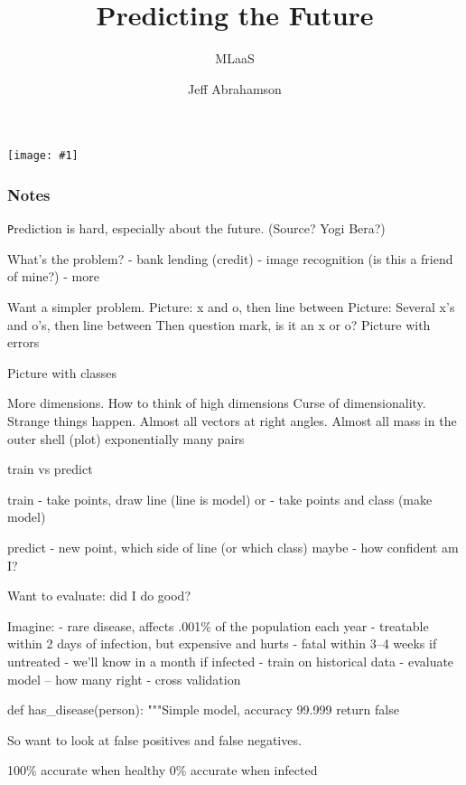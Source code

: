 \documentclass[t]{beamer}
\title
{Predicting the Future}
\subtitle{MLaaS}
\author[Abrahamson] {Jeff Abrahamson}\institute{Jellybooks}
\date[6 juin 2015]
\newcommand\blue[1]{\textcolor{blue}{#1}}
\newcommand\cimggg[1]{\centerline{\texttt{[image: \#1]}}}
\begin{document}
\begin{frame}
  \cimggg{web2day.png}
  
  \vfill
  \centerline{\fcolorbox{purple}{pink}{\blue{ici : Predicting the Future}}}
  \vfil
\end{frame}

\begin{frame}
  \titlepage
\end{frame}

\begin{frame}
  \frametitle{}

\end{frame}

\begin{frame}
  \frametitle{Notes}

  \texttt
  
  Prediction is hard, especially  about the future.  (Source?  Yogi Bera?)

  What's the problem?
  - bank lending (credit)
  - image recognition (is this a friend of mine?)
  - more

  Want a simpler problem.
  Picture: x and o, then line between
  Picture: Several x's and o's, then line between
  Then question mark, is it an x or o?
  Picture with errors

  Picture with classes

  More dimensions.  How to think of high dimensions
  Curse of dimensionality.
  Strange things happen.
  Almost all vectors at right angles.
  Almost all mass in the outer shell (plot)
  exponentially many pairs

  train vs predict

  train - take points, draw line (line is model)
     or - take points and class (make model)

  predict - new point, which side of line (or which class)
    maybe - how confident am I?

  Want to evaluate: did I do good?

  Imagine:
    - rare disease, affects .001\% of the population each year
    - treatable within 2 days of infection, but expensive and hurts
    - fatal within 3--4 weeks if untreated
    - we'll know in a month if infected
    - train on historical data
    - evaluate model -- how many right
    - cross validation

    def has_disease(person):
        """Simple model, accuracy 99.999%
        return false

    So want to look at false positives and false negatives.

    100\% accurate when healthy
    0\% accurate when infected
    
        

\end{frame}
\end{document}
